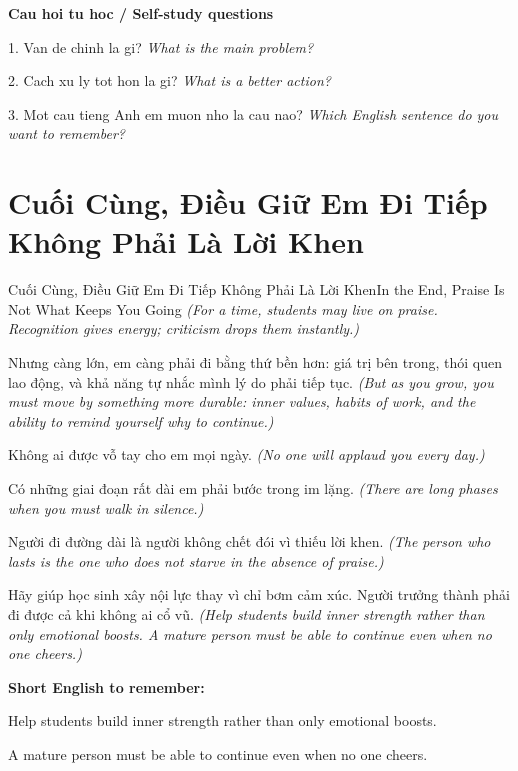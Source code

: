 \begin{tuhocnhanh}
\textbf{Cau hoi tu hoc / Self-study questions}

1. Van de chinh la gi? \textit{What is the main problem?}

2. Cach xu ly tot hon la gi? \textit{What is a better action?}

3. Mot cau tieng Anh em muon nho la cau nao? \textit{Which English sentence do you want to remember?}
\end{tuhocnhanh}
\ngancach

\section{Cuối Cùng, Điều Giữ Em Đi Tiếp Không Phải Là Lời Khen}
\begin{truyen}{Cuối Cùng, Điều Giữ Em Đi Tiếp Không Phải Là Lời Khen}{In the End, Praise Is Not What Keeps You Going}
\textit{(For a time, students may live on praise. Recognition gives energy; criticism drops them instantly.)}

Nhưng càng lớn, em càng phải đi bằng thứ bền hơn: giá trị bên trong, thói quen lao động, và khả năng tự nhắc mình lý do phải tiếp tục.
\textit{(But as you grow, you must move by something more durable: inner values, habits of work, and the ability to remind yourself why to continue.)}

Không ai được vỗ tay cho em mọi ngày.
\textit{(No one will applaud you every day.)}

Có những giai đoạn rất dài em phải bước trong im lặng.
\textit{(There are long phases when you must walk in silence.)}

Người đi đường dài là người không chết đói vì thiếu lời khen.
\textit{(The person who lasts is the one who does not starve in the absence of praise.)}

\end{truyen}

\begin{baihoc}
Hãy giúp học sinh xây nội lực thay vì chỉ bơm cảm xúc. Người trưởng thành phải đi được cả khi không ai cổ vũ.
\textit{(Help students build inner strength rather than only emotional boosts. A mature person must be able to continue even when no one cheers.)}
\end{baihoc}

\begin{ghinhoanh}
\textbf{Short English to remember:}

Help students build inner strength rather than only emotional boosts.

A mature person must be able to continue even when no one cheers.

\end{ghinhoanh}

